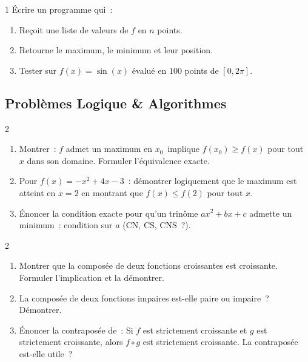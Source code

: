 \begin{bilan}
\begin{exo}{1}
\'Ecrire un programme qui~:
\begin{enumerate}
  \item Re\c coit une liste de valeurs de $f$ en $n$ points.
  \item Retourne le maximum, le minimum et leur position.
  \item Tester sur $f(x)=\sin(x)$ \'evalu\'e en $100$ points de $[0,2\pi]$.
\end{enumerate}
\end{exo}

\subsection*{Probl\`emes Logique \& Algorithmes}

\begin{probleme}{2}
\begin{enumerate}
  \item Montrer~: \og $f$ admet un maximum en $x_0$\fg\ implique
        \og $f(x_0)\geq f(x)$ pour tout $x$ dans son domaine\fg.
        Formuler l'\'equivalence exacte.
  \item Pour $f(x)=-x^2+4x-3$~: d\'emontrer logiquement que le maximum
        est atteint en $x=2$ en montrant que $f(x)\leq f(2)$ pour tout $x$.
  \item \'Enoncer la condition exacte pour qu'un trin\^ome $ax^2+bx+c$
        admette un minimum~: condition sur $a$ (CN, CS, CNS~?).
\end{enumerate}
\end{probleme}

\begin{probleme}{2}
\begin{enumerate}
  \item Montrer que la compos\'ee de deux fonctions croissantes est croissante.
        Formuler l'implication et la d\'emontrer.
  \item La compos\'ee de deux fonctions impaires est-elle paire ou impaire~?
        D\'emontrer.
  \item \'Enoncer la contrapos\'ee de~:
        \og Si $f$ est strictement croissante et $g$ est strictement croissante,
        alors $f\circ g$ est strictement croissante.\fg
        La contrapos\'ee est-elle utile~?
\end{enumerate}
\end{probleme}


\end{bilan}

